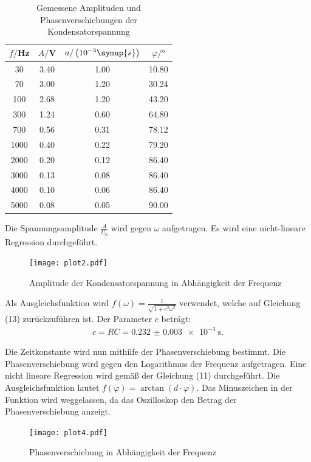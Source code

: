 \begin{table}[H]
  \centering
  \caption{Gemessene Amplituden und Phasenverschiebungen der Kondensatorspannung}
  \label{tab:amplitude}
  \begin{tabular}{c c c c}
    \toprule
    $f/$Hz & $A/$V & $a/\left(10^{-3}\symup{s}\right)$ & $\varphi /°$ \\
    \midrule
    30   &  3.40 &    1.00 &  10.80 \\
    70   &  3.00 &    1.20 &  30.24 \\
    100  &  2.68 &    1.20 &  43.20 \\
    300  &  1.24 &    0.60 &  64.80 \\
    700  &  0.56 &    0.31 &  78.12 \\
    1000 &  0.40 &    0.22 &  79.20 \\
    2000 &  0.20 &    0.12 &  86.40 \\
    3000 &  0.13 &    0.08 &  86.40 \\
    4000 &  0.10 &    0.06 &  86.40 \\
    5000 &  0.08 &    0.05 &  90.00 \\
    \bottomrule
  \end{tabular}
\end{table}

Die Spannungsamplitude $\frac{A}{U_0}$ wird gegen $\omega$ aufgetragen. Es wird eine nicht-lineare
Regression durchgeführt.

\begin{figure}[H]
  \centering
  \texttt{[image: plot2.pdf]}
  \caption{Amplitude der Kondensatorspannung in Abhängigkeit der Frequenz}
  \label{fig:amplitude}
\end{figure}

Als Ausgleichsfunktion wird $f(\omega) = \frac{1}{\sqrt{1 + c^2 \omega^2}}$ verwendet, welche auf Gleichung (13)
zurückzuführen ist.
Der Parameter $c$ beträgt:
\begin{align*}
  c = RC = \SI{0.232(3)e-3}{\second}.
\end{align*}

Die Zeitkonstante wird nun mithilfe der Phasenverschiebung bestimmt. Die Phasenverschiebung wird gegen
den Logarithmus der Frequenz aufgetragen. Eine nicht lineare Regression wird gemäß der Gleichung (11) durchgeführt.
Die Ausgleichsfunktion lautet $f(\varphi) = \arctan(d \cdot \varphi)$. Das Minuszeichen in der Funktion wird
weggelassen, da das Oszilloskop den Betrag der Phasenverschiebung anzeigt.

\begin{figure}[H]
  \centering
  \texttt{[image: plot4.pdf]}
  \caption{Phasenverschiebung in Abhängigkeit der Frequenz}
  \label{fig:phasenverschiebung}
\end{figure}

